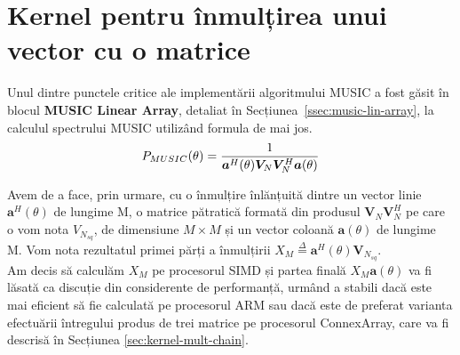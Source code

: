 \section{Kernel pentru înmulțirea unui vector cu o matrice}
\label{sec:kernel-mult-array}

Unul dintre punctele critice ale implementării algoritmului MUSIC a fost găsit
în blocul \textbf{MUSIC Linear Array}, detaliat în
Secțiunea~\ref{ssec:music-lin-array}, la calculul spectrului MUSIC utilizând
formula de mai jos.
\begin{equation}
    P_{MUSIC}(\theta) =
        \frac{1}
             {\bm{a}^H(\theta)\bm{V}_N\bm{V}_N^H\bm{a}(\theta)} \\
\label{eq:music-spectrum-kernel}
\end{equation}

Avem de a face, prin urmare, cu o înmulțire înlănțuită dintre un vector linie
$\bm{a}^H(\theta)$ de lungime M, o matrice pătratică formată din produsul
$\bm{V}_N\bm{V}_N^H$ pe care o vom nota $V_{N_{sq}}$, de dimensiune $M \times M$
și un vector coloană $\bm{a}(\theta)$ de lungime M. Vom nota rezultatul primei
părți a înmulțirii $X_M \overset{\Delta}{=} \bm{a}^H(\theta)\bm{V}_{N_{sq}}$. \\

Am decis să calculăm $X_M$ pe procesorul SIMD și partea finală
$X_M\bm{a}(\theta)$ va fi lăsată ca discuție din considerente de
performanță, urmând  a stabili dacă este mai eficient să fie calculată pe
procesorul ARM sau dacă este de preferat varianta efectuării întregului produs
de trei matrice pe procesorul ConnexArray, care va fi descrisă în Secțiunea
\ref{sec:kernel-mult-chain}. \\

